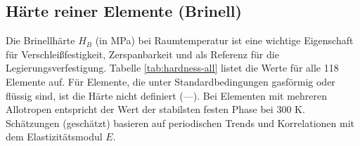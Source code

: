 \documentclass[12pt,a4paper]{article}
\begin{document}
	\subsection{Härte reiner Elemente (Brinell)}
	\label{subsec:hardness}
	
	Die Brinellhärte \(H_B\) (in MPa) bei Raumtemperatur ist eine wichtige Eigenschaft für Verschleißfestigkeit, Zerspanbarkeit und als Referenz für die Legierungsverfestigung. Tabelle \ref{tab:hardness-all} listet die Werte für alle 118 Elemente auf. Für Elemente, die unter Standardbedingungen gasförmig oder flüssig sind, ist die Härte nicht definiert (—). Bei Elementen mit mehreren Allotropen entspricht der Wert der stabilsten festen Phase bei 300 K. Schätzungen (geschätzt) basieren auf periodischen Trends und Korrelationen mit dem Elastizitätsmodul \(E\).
	
\end{document}
